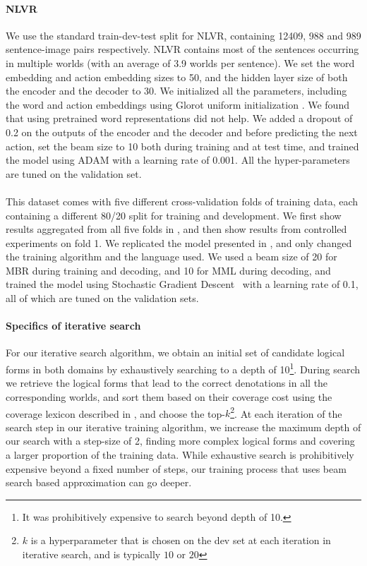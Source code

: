 \paragraph{NLVR} We use the standard train-dev-test split for NLVR, containing 12409, 988 and 989 sentence-image pairs respectively. NLVR contains most of the sentences occurring in multiple worlds (with an average of 3.9 worlds per sentence). We set the word embedding and action embedding sizes to 50, and the hidden layer size of both the encoder and the decoder to 30. We initialized all the parameters, including the word and action embeddings using Glorot uniform initialization \citep{glorot2010understanding}. We found that using pretrained word representations did not help. We added a dropout \citep{srivastava2014dropout} of 0.2 on the outputs of the encoder and the decoder and before predicting the next action, set the beam size to 10 both during training and at test time, and trained the model using ADAM \citep{kingma2014adam} with a learning rate of 0.001. All the hyper-parameters are tuned on the validation set. 


\paragraph{\WTQ} This dataset comes with five different cross-validation folds of training data, each containing a different 80/20 split for training and development. We first show results aggregated from all five folds in , and then show results from controlled experiments on fold 1. We replicated the model presented in \citet{krishnamurthy2017neural}, and only changed the training algorithm and the language used. We used a beam size of 20 for MBR during training and decoding, and 10 for MML during decoding, and trained the model using Stochastic Gradient Descent~\citep{kiefer1952stochastic} with a learning rate of 0.1, all of which are tuned on the validation sets.

\paragraph{Specifics of iterative search} For our iterative search algorithm, we obtain an initial set of candidate logical forms in both domains by exhaustively searching to a depth of 10\footnote{It was prohibitively expensive to search beyond depth of 10.}. During search we retrieve the logical forms that lead to the correct denotations in all the corresponding worlds, and sort them based on their coverage cost using the coverage lexicon described in , and choose the top-$k$\footnote{$k$ is a hyperparameter that is chosen on the dev set at each iteration in iterative search, and is typically $10$ or $20$}. At each iteration of the search step in our iterative training algorithm, we increase the maximum depth of our search with a step-size of 2, finding more complex logical forms and covering a larger proportion of the training data. While exhaustive search is prohibitively expensive beyond a fixed number of steps, our training process that uses beam search based approximation can go deeper.

